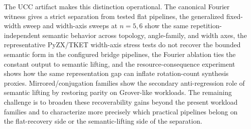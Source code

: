 \documentclass[11pt]{article}
\begin{document}
The UCC artifact makes this distinction operational. The canonical Fourier
witness gives a strict separation from tested flat pipelines, the generalized
fixed-width sweep and width-axis sweeps at $n=5, 6$ show the same
repetition-independent semantic behavior across topology, angle-family, and
width axes, the representative PyZX/TKET width-axis stress tests do not recover
the bounded semantic form in the configured bridge pipelines, the Fourier
ablation ties the constant output to semantic lifting, and the
resource-consequence experiment shows how the same representation gap can
inflate rotation-count synthesis proxies.
Mirrored/conjugation families show the secondary anti-regression role of
semantic lifting by restoring parity on Grover-like workloads. The remaining
challenge is to broaden these recoverability gains beyond the present workload
families and to characterize more precisely which practical pipelines belong on
the flat-recovery side or the semantic-lifting side of the separation.
\end{document}
